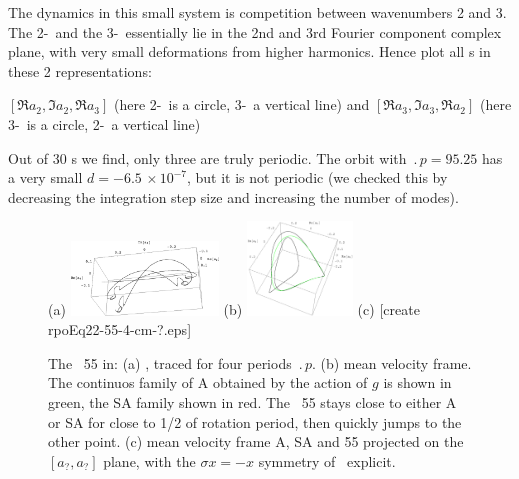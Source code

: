 The dynamics in this small system is competition between wavenumbers
2 and 3. The 2-\eqv\  and the 3-\eqv\  essentially lie in
the 2nd and 3rd Fourier component complex plane, with very
small deformations from higher harmonics.
Hence plot all \rpo s in these 2 representations:

$[ \Re a_2, \Im a_2, \Re a_3 ]$
(here 2-\eqv\  is a circle, 3-\eqv\ a vertical line)
 and
$[ \Re a_3, \Im a_3, \Re a_2 ]$
(here 3-\eqv\ is a circle, 2-\eqv\ a vertical line)

%
Out of 30 \rpo s we
find,  only three are truly periodic.  The orbit
with $\period{p} = 95.25$ has a very small
$d = -6.5\,\times 10^{-7}$, but it is not periodic
(we
checked this by decreasing the integration step size and increasing the
number of modes).


\begin{figure}[t] \label{f:rpo55}
\begin{center}
(a) \includegraphics[width=0.35\textwidth]{figs/rpo22-55-4-clean.eps}
(b) \includegraphics[width=0.25\textwidth]{figs/rpoEq22-55-4-cm.eps}
(c) [create rpoEq22-55-4-cm-?.eps]
\end{center}
\caption{
 The \rpo\ {\nameit}55 in:
 (a) \Statesp, traced for four periods $\period{p}$.
 (b) mean velocity frame.
        The continuos family of
    {\eqva} A obtained by the action of $g$ is shown in green,
    the SA family shown in red. The \rpo\ {\nameit}55 stays close
    to either A or SA for close to 1/2 of {\eqv} rotation
    period, then quickly jumps to the other {\eqv} point.
 (c) mean velocity frame A, SA and {\nameit}55 projected on the
    $[a_?,a_?]$ plane,
    with the $\sigma x = -x$ symmetry of \KSe\ explicit.
        }
\end{figure}



